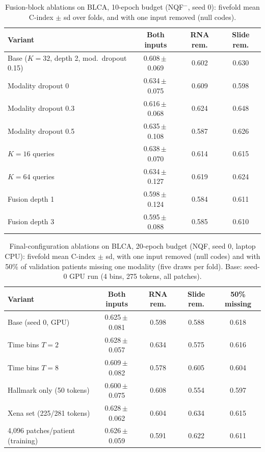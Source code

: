 \documentclass[9pt,journal]{IEEEtran}
\newcommand{\tabsize}{\scriptsize}
\newcommand{\pqf}{NQF}
\newcommand{\pqm}{NQF$^{-}$}
\newcommand{\cindex}{C-index}
\newcommand{\pmv}[2]{#1\,$\pm$\,#2}
\begin{document}
\begin{table}[!t]
\caption{Fusion-block ablations on BLCA, 10-epoch budget (\pqm{}, seed 0): fivefold mean \cindex{} $\pm$ sd over folds, and with one input removed (null codes).}
\label{tab:ablate}
\centering
\tabsize
\setlength{\tabcolsep}{3pt}
\begin{tabular}{@{}lccc@{}}
\toprule
Variant & Both inputs & RNA rem. & Slide rem. \\
\midrule
Base ($K{=}32$, depth 2, mod.\ dropout 0.15) & \pmv{0.608}{0.069} & 0.602 & 0.630 \\
Modality dropout 0 & \pmv{0.634}{0.075} & 0.609 & 0.598 \\
Modality dropout 0.3 & \pmv{0.616}{0.068} & 0.624 & 0.648 \\
Modality dropout 0.5 & \pmv{0.635}{0.108} & 0.587 & 0.626 \\
$K = 16$ queries & \pmv{0.638}{0.070} & 0.614 & 0.615 \\
$K = 64$ queries & \pmv{0.634}{0.127} & 0.619 & 0.624 \\
Fusion depth 1 & \pmv{0.598}{0.124} & 0.584 & 0.611 \\
Fusion depth 3 & \pmv{0.595}{0.088} & 0.585 & 0.610 \\
\bottomrule
\end{tabular}
\end{table}

\begin{table}[!t]
\caption{Final-configuration ablations on BLCA, 20-epoch budget (\pqf{}, seed 0, laptop CPU): fivefold mean \cindex{} $\pm$ sd, with one input removed (null codes) and with 50\% of validation patients missing one modality (five draws per fold). Base: seed-0 GPU run (4 bins, 275 tokens, all patches).}
\label{tab:finalconfig}
\centering
\tabsize
\setlength{\tabcolsep}{3pt}
\begin{tabular}{@{}lcccc@{}}
\toprule
Variant & Both inputs & RNA rem. & Slide rem. & 50\% missing \\
\midrule
Base (seed 0, GPU) & \pmv{0.625}{0.081} & 0.598 & 0.588 & 0.618 \\
Time bins $T = 2$ & \pmv{0.628}{0.057} & 0.634 & 0.575 & 0.616 \\
Time bins $T = 8$ & \pmv{0.609}{0.082} & 0.578 & 0.605 & 0.604 \\
Hallmark only (50 tokens) & \pmv{0.600}{0.075} & 0.608 & 0.554 & 0.597 \\
Xena set (225/281 tokens) & \pmv{0.628}{0.062} & 0.604 & 0.634 & 0.615 \\
4,096 patches/patient (training) & \pmv{0.626}{0.059} & 0.591 & 0.622 & 0.611 \\
\bottomrule
\end{tabular}
\end{table}
\end{document}
